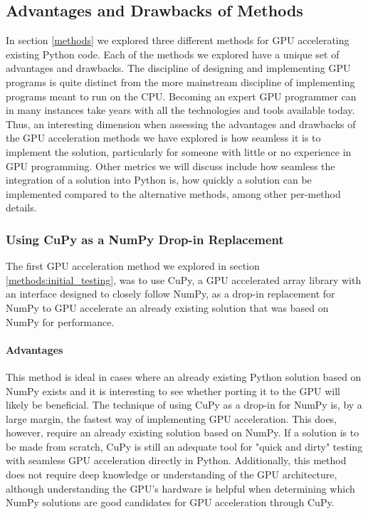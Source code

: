 \subsection{Advantages and Drawbacks of Methods} \label{discussion:advantages_and_drawbacks_of_methods}
In section \ref{methods} we explored three different methods for GPU accelerating existing Python code.
Each of the methods we explored have a unique set of advantages and drawbacks.
The discipline of designing and implementing GPU programs is quite distinct from the more mainstream discipline of implementing programs meant to run on the CPU.
Becoming an expert GPU programmer can in many instances take years with all the technologies and tools available today.
Thus, an interesting dimension when assessing the advantages and drawbacks of the GPU acceleration methods we have explored is how seamless it is to implement the solution, particularly for someone with little or no experience in GPU programming.
Other metrics we will discuss include how seamless the integration of a solution into Python is, how quickly a solution can be implemented compared to the alternative methods, among other per-method details.

\subsubsection{Using CuPy as a NumPy Drop-in Replacement} \label{discussion:using_cupy_as_a_numpy_drop_in_replacement}
The first GPU acceleration method we explored in section \ref{methods:initial_testing}, was to use CuPy, a GPU accelerated array library with an interface designed to closely follow NumPy, as a drop-in replacement for NumPy to GPU accelerate an already existing solution that was based on NumPy for performance.

\paragraph{Advantages}
This method is ideal in cases where an already existing Python solution based on NumPy exists and it is interesting to see whether porting it to the GPU will likely be beneficial.
The technique of using CuPy as a drop-in for NumPy is, by a large margin, the fastest way of implementing GPU acceleration.
This does, however, require an already existing solution based on NumPy.
If a solution is to be made from scratch, CuPy is still an adequate tool for "quick and dirty" testing with seamless GPU acceleration directly in Python.
Additionally, this method does not require deep knowledge or understanding of the GPU architecture, although understanding the GPU's hardware is helpful when determining which NumPy solutions are good candidates for GPU acceleration through CuPy.

